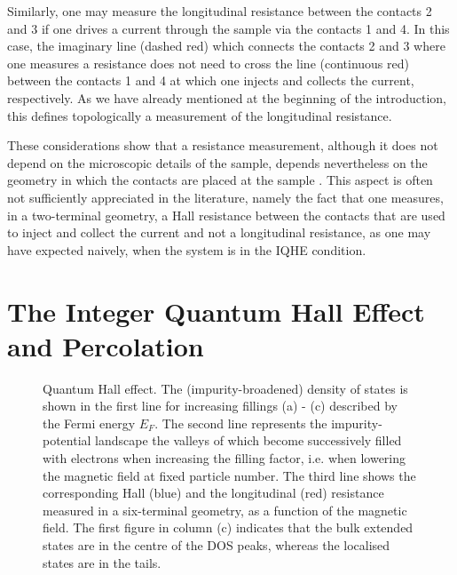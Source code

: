 \documentclass[10pt]{book}
\begin{document}
Similarly, 
one may measure the longitudinal resistance between the contacts 2 and 3 if one drives a current through the sample via the
contacts 1 and 4. In this case, the imaginary line (dashed red) which connects the contacts 2 and 3 where one measures a 
resistance does not need to cross the line (continuous red) between the contacts 1 and 4 at which one injects and collects
the current, respectively. As we have already mentioned at the beginning of the introduction, this defines 
topologically a measurement of the longitudinal resistance.

These considerations show that a resistance measurement, although it does not depend on the microscopic details of the sample,
depends nevertheless on the geometry in which the contacts are placed at the sample \cite{buett,butt}. This aspect is often 
not sufficiently appreciated in the literature, namely the fact that one measures, in a two-terminal geometry, a Hall resistance
between the contacts that are used to inject and collect the current and not a longitudinal resistance, as one may have expected
naively, when the system is in the IQHE condition.


\section[整数量子Hall效应和过滤沥滤法]{The Integer Quantum Hall Effect and Percolation}
\label{PercIQHE}





\begin{figure}[h]
\begin{center}
\end{center}
\caption{ Quantum Hall effect. The (impurity-broadened) density of states is shown in the first line for increasing fillings 
(a) - (c) described by the Fermi energy $E_F$. The second line represents the impurity-potential landscape the valleys of which
become successively filled with electrons when increasing the filling factor, i.e. when lowering the magnetic field at fixed 
particle number. The third line shows the corresponding
Hall (blue) and the longitudinal (red) resistance measured in a six-terminal geometry, as a function of the magnetic field.
The first figure in column (c) indicates that the bulk extended states are in the centre of the DOS peaks, whereas the
localised states are in the tails.}
\label{fig15}
\end{figure}
\end{document}
